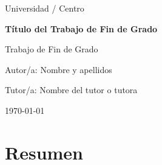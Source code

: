 \documentclass[12pt,a4paper,oneside]{report}
\title{\titulo}
\author{\autor}
\date{\fecha}
\newcommand{\titulo}{Título del Trabajo de Fin de Grado}
\newcommand{\autor}{Nombre y apellidos}
\newcommand{\fecha}{\today}
\begin{document}
\begin{titlepage}
    \centering
    {\Large Universidad / Centro\par}
    \vspace{2cm}
    {\huge\bfseries \titulo\par}
    \vspace{2cm}
    {\Large Trabajo de Fin de Grado\par}
    \vfill
    {\large Autor/a: \autor\par}
    \vspace{0.5cm}
    {\large Tutor/a: Nombre del tutor o tutora\par}
    \vspace{1cm}
    {\large \fecha\par}
\end{titlepage}
\setcounter{page}{2}

\chapter*{Resumen}


\tableofcontents
\clearpage
{}




\nocite{*}


\end{document}
